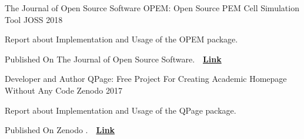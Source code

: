 \begin{cventries}
  \cventry
    {The Journal of Open Source Software} %
    {OPEM: Open Source PEM Cell Simulation Tool} %
    {JOSS} %
    {2018} %
    {
      \begin{cvitems} %
        \item {Report about Implementation and Usage of the OPEM package.}
        \item {Published On The Journal of Open Source Software.~~\href{https://www.theoj.org/joss-papers/joss.00676/10.21105.joss.00676.pdf}{\textbf{Link}}}
      \end{cvitems}
    }

  \cventry
    {Developer and Author} %
    {QPage: Free Project For Creating Academic Homepage Without Any Code} %
    {Zenodo} %
    {2017} %
    {
      \begin{cvitems} %
        \item {Report about Implementation and Usage of the QPage package.}
        \item {Published On Zenodo .~~\href{http://doi.org/10.5281/zenodo.265544}{\textbf{Link}}}
      \end{cvitems}
    }

\end{cventries}
